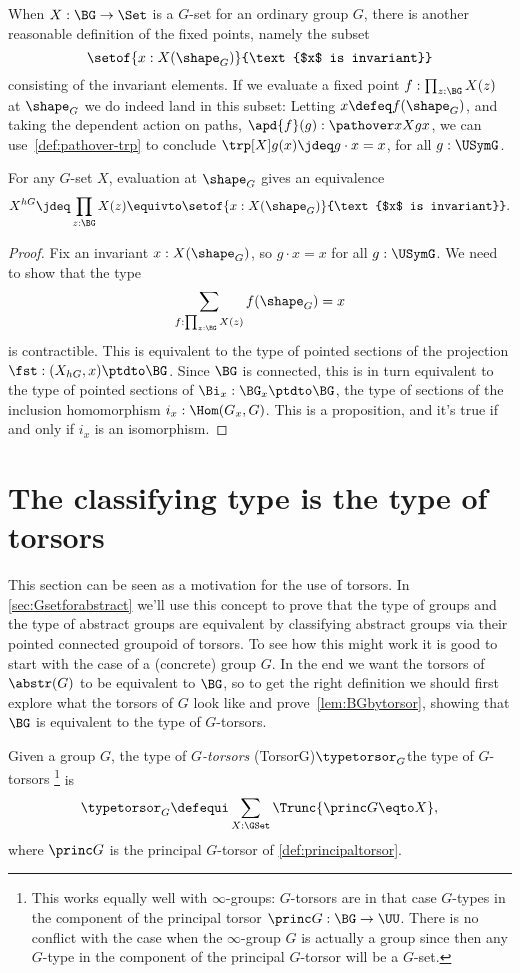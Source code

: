 When $X : \BG \to \Set$ is a $G$-set for an ordinary group $G$,
there is another reasonable definition of the fixed points,
namely the subset
\[
  \setof{x : X(\shape_G)}{\text{$x$ is invariant}}
\]
consisting of the invariant elements.
If we evaluate a fixed point $f : \prod_{z:\BG}X(z)$ at $\shape_G$
we do indeed land in this subset:
Letting $x\defeq f(\shape_G)$,
and taking the dependent action on paths,
$\apd{f}(g) : \pathover x X g x$,
we can use~\cref{def:pathover-trp} to conclude
$\trp[X] g(x)\jdeq g\cdot x = x$, for all $g:\USymG$.

\begin{lemma}\label{lem:fixpts-are-fixed}
  For any $G$-set $X$, evaluation at $\shape_G$ gives an equivalence
  \[
    X^{hG} \jdeq \prod_{z:\BG}X(z) \equivto
    \setof{x : X(\shape_G)}{\text{$x$ is invariant}}.
  \]
\end{lemma}
\begin{proof}
  Fix an invariant $x : X(\shape_G)$,
  so $g\cdot x = x$ for all $g: \USymG$.
  We need to show that the type
  \[
    \sum_{f : \prod_{z:\BG}X(z)}f(\shape_G)=x
  \]
  is contractible.
  This is equivalent to the type of pointed sections
  of the projection $\fst : (X_{hG},x) \ptdto \BG$.
  Since $\BG$ is connected, this is in turn equivalent
  to the type of pointed sections of $\Bi_x : \BG_x \ptdto \BG$,
  \ie the type of sections of the inclusion homomorphism $i_x:\Hom(G_x,G)$.
  This is a proposition, and it's true if and only if $i_x$ is an isomorphism.
\end{proof}

\section{The classifying type is the type of torsors}
\label{sec:torsors}
This section can be seen as a motivation for the use of torsors.
In \cref{sec:Gsetforabstract} we'll use this concept to prove that the type of groups and the type of abstract groups are equivalent by classifying abstract groups via their pointed connected groupoid of torsors.  To see how this might work it is good to start with the case of a (concrete) group $G$.
In the end we want the torsors of $\abstr(G)$ to be equivalent to $\BG$, so to get the right definition we should first explore what the torsors of $G$ look like and prove~\cref{lem:BGbytorsor}, showing that $\BG$ is equivalent to the type of $G$-torsors.
\begin{definition}\label{def:Gtorsor}
  Given a group $G$, the type of \emph{$G$-torsors}%
  \glossary(TorsorG){$\protect\typetorsor_G$}{the type of $G$-torsors}%
  \footnote{This works equally well with $\infty$-groups: $G$-torsors are in that case $G$-types in the component of the principal torsor $\princ G:\BG\to\UU$. There is no conflict with the case when the $\infty$-group $G$ is actually a group since then any $G$-type in the component of the principal $G$-torsor will be a $G$-set.}
  is
  \[
    \typetorsor_G\defequi\sum_{X:\GSet}\Trunc{\princ G \eqto X},
  \]
  where $\princ G$ is the principal $G$-torsor of \cref{def:principaltorsor}.
\end{definition}

